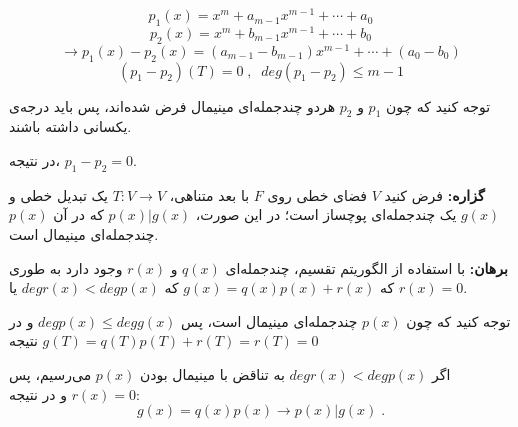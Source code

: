$$p_1(x)=x^m+a_{m-1}x^{m-1}+\cdots+a_0$$
$$p_2(x)=x^m+b_{m-1}x^{m-1}+\cdots+b_0$$
$$\to p_1(x)-p_2(x) = (a_{m-1}-b_{m-1})x^{m-1} +\cdots + (a_0-b_0)$$
$$ (p_1-p_2)(T)=0 \; , \; \; deg(p_1-p_2)\leq m-1$$

توجه کنید که چون $p_1$ و $p_2$ هردو چندجمله‌ای مینیمال فرض شده‌اند، پس باید درجه‌ی یکسانی داشته باشند.

در نتیجه،
$p_1-p_2=0$.

\textbf{گزاره:}
فرض کنید $V$  فضای خطی روی $F$ با بعد متناهی،
$T:V\to V$
یک تبدیل خطی و $g(x)$ یک چندجمله‌ای پوچساز است؛ در این صورت،
$p(x)|g(x)$
که در آن $p(x)$ چندجمله‌ای مینیمال است.

\textbf{برهان:}
با استفاده از الگوریتم تقسیم، چندجمله‌ای $q(x)$ و $r(x)$ وجود دارد به طوری که
$g(x)=q(x)p(x)+r(x)$
که
$deg r(x)<degp(x)$
یا
$r(x)=0$.

توجه کنید که چون $p(x)$ چندجمله‌ای مینیمال است، پس
$degp(x)\leq degg(x)$
و در نتیجه
$g(T)=q(T)p(T)+r(T)=r(T)=0$

اگر $degr(x)<degp(x)$ به تناقض با مینیمال بودن $p(x)$ می‌رسیم، پس $r(x)=0$ و در نتیجه:
$$g(x)=q(x)p(x)\to p(x)|g(x)\;.$$